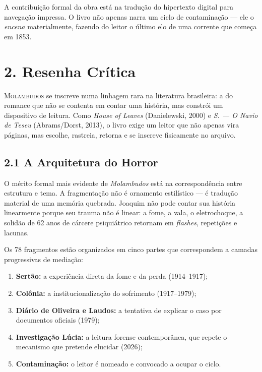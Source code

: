 \documentclass[14pt,openany]{extbook}
\begin{document}
\vspace{0.4em}
\noindent A contribuição formal da obra está na tradução do hipertexto digital para navegação impressa. O livro não apenas narra um ciclo de contaminação --- ele o \textit{encena} materialmente, fazendo do leitor o último elo de uma corrente que começa em 1853.

\chapter*{2. Resenha Crítica}

\noindent\lettrine[lines=3,findent=2pt,nindent=4pt]{\textcolor{sangue}{M}}{olambudos} se inscreve numa linhagem rara na literatura brasileira: a do romance que não se contenta em contar uma história, mas constrói um dispositivo de leitura. Como \textit{House of Leaves} (Danielewski, 2000) e \textit{S. --- O Navio de Teseu} (Abrams/Dorst, 2013), o livro exige um leitor que não apenas vira páginas, mas escolhe, rastreia, retorna e se inscreve fisicamente no arquivo.

\section*{2.1 A Arquitetura do Horror}

O mérito formal mais evidente de \textit{Molambudos} está na correspondência entre estrutura e tema. A fragmentação não é ornamento estilístico --- é tradução material de uma memória quebrada. Joaquim não pode contar sua história linearmente porque seu trauma não é linear: a fome, a vala, o eletrochoque, a solidão de 62 anos de cárcere psiquiátrico retornam em \textit{flashes}, repetições e lacunas.

Os 78 fragmentos estão organizados em cinco partes que correspondem a camadas progressivas de mediação:
\begin{enumerate}
\item \textbf{Sertão:} a experiência direta da fome e da perda (1914--1917);
\item \textbf{Colônia:} a institucionalização do sofrimento (1917--1979);
\item \textbf{Diário de Oliveira e Laudos:} a tentativa de explicar o caso por documentos oficiais (1979);
\item \textbf{Investigação Lúcia:} a leitura forense contemporânea, que repete o mecanismo que pretende elucidar (2026);
\item \textbf{Contaminação:} o leitor é nomeado e convocado a ocupar o ciclo.
\end{enumerate}
\end{document}

